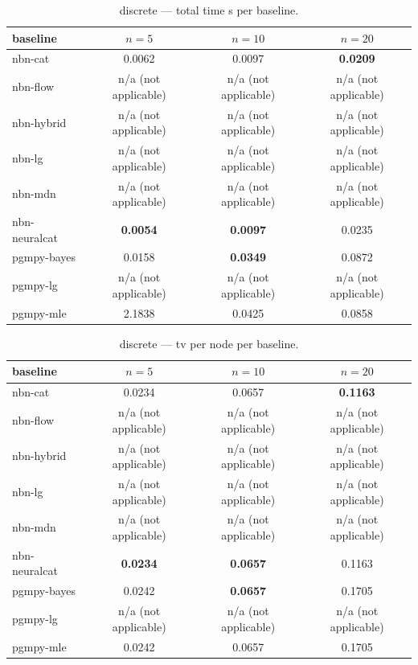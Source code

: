 \begin{table}[h]
\centering
\caption{discrete — total time s per baseline.}
\label{tab:discrete_total_time_s}
\begin{tabular}{lccc}
\toprule
baseline & $n=5$ & $n=10$ & $n=20$ \\
\midrule
nbn-cat & 0.0062 & 0.0097 & \textbf{0.0209} \\
nbn-flow & n/a (not applicable) & n/a (not applicable) & n/a (not applicable) \\
nbn-hybrid & n/a (not applicable) & n/a (not applicable) & n/a (not applicable) \\
nbn-lg & n/a (not applicable) & n/a (not applicable) & n/a (not applicable) \\
nbn-mdn & n/a (not applicable) & n/a (not applicable) & n/a (not applicable) \\
nbn-neuralcat & \textbf{0.0054} & \textbf{0.0097} & 0.0235 \\
pgmpy-bayes & 0.0158 & \textbf{0.0349} & 0.0872 \\
pgmpy-lg & n/a (not applicable) & n/a (not applicable) & n/a (not applicable) \\
pgmpy-mle & 2.1838 & 0.0425 & 0.0858 \\
\bottomrule
\end{tabular}
\end{table}

\begin{table}[h]
\centering
\caption{discrete — tv per node per baseline.}
\label{tab:discrete_tv_per_node}
\begin{tabular}{lccc}
\toprule
baseline & $n=5$ & $n=10$ & $n=20$ \\
\midrule
nbn-cat & 0.0234 & 0.0657 & \textbf{0.1163} \\
nbn-flow & n/a (not applicable) & n/a (not applicable) & n/a (not applicable) \\
nbn-hybrid & n/a (not applicable) & n/a (not applicable) & n/a (not applicable) \\
nbn-lg & n/a (not applicable) & n/a (not applicable) & n/a (not applicable) \\
nbn-mdn & n/a (not applicable) & n/a (not applicable) & n/a (not applicable) \\
nbn-neuralcat & \textbf{0.0234} & \textbf{0.0657} & 0.1163 \\
pgmpy-bayes & 0.0242 & \textbf{0.0657} & 0.1705 \\
pgmpy-lg & n/a (not applicable) & n/a (not applicable) & n/a (not applicable) \\
pgmpy-mle & 0.0242 & 0.0657 & 0.1705 \\
\bottomrule
\end{tabular}
\end{table}

